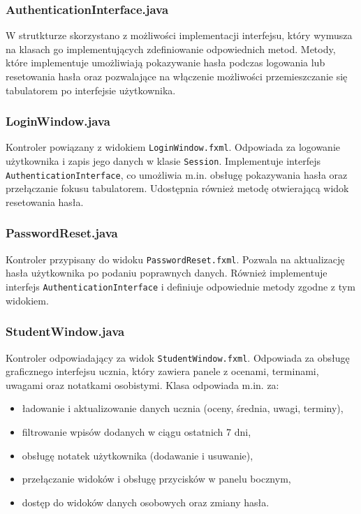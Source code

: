 \subsubsection*{AuthenticationInterface.java}
W strutkturze skorzystano z możliwości implementacji interfejsu, który wymusza na klasach go implementujących zdefiniowanie odpowiednich metod. Metody, które implementuje umożliwiają pokazywanie hasła podczas logowania lub resetowania hasła oraz pozwalające na włączenie możliwości przemieszczanie się tabulatorem po interfejsie użytkownika.

\subsubsection*{LoginWindow.java}
Kontroler powiązany z widokiem \texttt{LoginWindow.fxml}. Odpowiada za logowanie użytkownika i zapis jego danych w klasie \texttt{Session}. Implementuje interfejs \texttt{AuthenticationInterface}, co umożliwia m.in. obsługę pokazywania hasła oraz przełączanie fokusu tabulatorem. Udostępnia również metodę otwierającą widok resetowania hasła.

\subsubsection*{PasswordReset.java}
Kontroler przypisany do widoku \texttt{PasswordReset.fxml}. Pozwala na aktualizację hasła użytkownika po podaniu poprawnych danych. Również implementuje interfejs \texttt{AuthenticationInterface} i definiuje odpowiednie metody zgodne z tym widokiem.

\subsubsection*{StudentWindow.java}
Kontroler odpowiadający za widok \texttt{StudentWindow.fxml}. Odpowiada za obsługę graficznego interfejsu ucznia, który zawiera panele z ocenami, terminami, uwagami oraz notatkami osobistymi. Klasa odpowiada m.in. za:
\begin{itemize}
    \item ładowanie i aktualizowanie danych ucznia (oceny, średnia, uwagi, terminy),
    \item filtrowanie wpisów dodanych w ciągu ostatnich 7 dni,
    \item obsługę notatek użytkownika (dodawanie i usuwanie),
    \item przełączanie widoków i obsługę przycisków w panelu bocznym,
    \item dostęp do widoków danych osobowych oraz zmiany hasła.
\end{itemize}
\newpage

